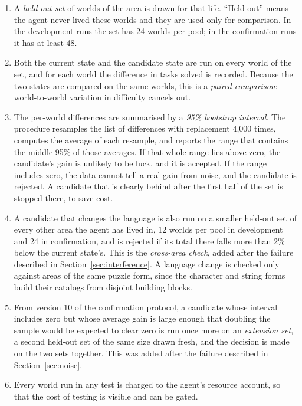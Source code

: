 \documentclass[11pt]{article}
\begin{document}
\begin{enumerate}[leftmargin=*]
\item A \emph{held-out set} of worlds of the area is drawn for that life. ``Held out'' means the agent never lived these worlds and they are used only for comparison. In the development runs the set has 24 worlds per pool; in the confirmation runs it has at least 48.
\item Both the current state and the candidate state are run on every world of the set, and for each world the difference in tasks solved is recorded. Because the two states are compared on the same worlds, this is a \emph{paired comparison}: world-to-world variation in difficulty cancels out.
\item The per-world differences are summarised by a \emph{95\% bootstrap interval}. The procedure resamples the list of differences with replacement 4,000 times, computes the average of each resample, and reports the range that contains the middle 95\% of those averages. If that whole range lies above zero, the candidate's gain is unlikely to be luck, and it is accepted. If the range includes zero, the data cannot tell a real gain from noise, and the candidate is rejected. A candidate that is clearly behind after the first half of the set is stopped there, to save cost.
\item A candidate that changes the language is also run on a smaller held-out set of every other area the agent has lived in, 12 worlds per pool in development and 24 in confirmation, and is rejected if its total there falls more than 2\% below the current state's. This is the \emph{cross-area check}, added after the failure described in Section~\ref{sec:interference}. A language change is checked only against areas of the same puzzle form, since the character and string forms build their catalogs from disjoint building blocks.
\item From version 10 of the confirmation protocol, a candidate whose interval includes zero but whose average gain is large enough that doubling the sample would be expected to clear zero is run once more on an \emph{extension set}, a second held-out set of the same size drawn fresh, and the decision is made on the two sets together. This was added after the failure described in Section~\ref{sec:noise}.
\item Every world run in any test is charged to the agent's resource account, so that the cost of testing is visible and can be gated.
\end{enumerate}
\end{document}
